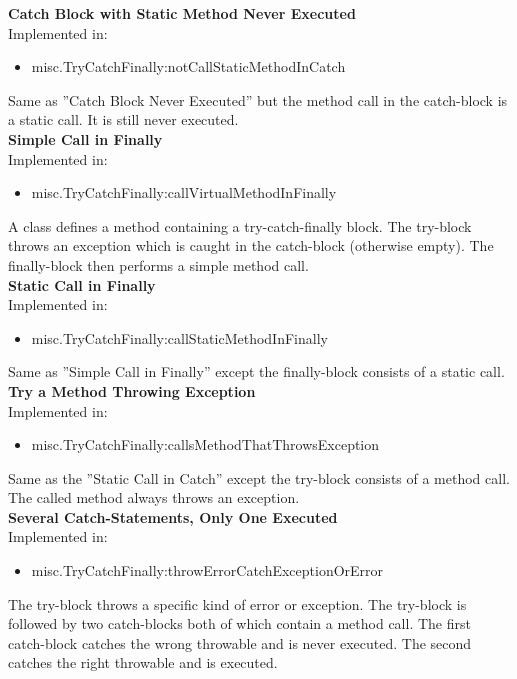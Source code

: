 \documentclass{article}
\begin{document}
\noindent
\textbf{Catch Block with Static Method Never Executed}\\
Implemented in: 
\begin{itemize}
    \item misc.TryCatchFinally:notCallStaticMethodInCatch
\end{itemize}
Same as ''Catch Block Never Executed'' but the method call in the catch-block is a static call. It is still never executed.\\

\noindent
\textbf{Simple Call in Finally}\\
Implemented in: 
\begin{itemize}
    \item misc.TryCatchFinally:callVirtualMethodInFinally
\end{itemize}
A class defines a method containing a try-catch-finally block. The try-block throws an exception which is caught in the catch-block (otherwise empty). The finally-block then performs a simple method call.\\

\noindent
\textbf{Static Call in Finally}\\
Implemented in: 
\begin{itemize}
    \item misc.TryCatchFinally:callStaticMethodInFinally
\end{itemize}
Same as ''Simple Call in Finally'' except the finally-block consists of a static call.\\

\noindent
\textbf{Try a Method Throwing Exception}\\
Implemented in: 
\begin{itemize}
    \item misc.TryCatchFinally:callsMethodThatThrowsException
\end{itemize}
Same as the ''Static Call in Catch'' except the try-block consists of a method call. The called method always throws an exception.\\

\noindent
\textbf{Several Catch-Statements, Only One Executed}\\
Implemented in: 
\begin{itemize}
    \item misc.TryCatchFinally:throwErrorCatchExceptionOrError
\end{itemize}
The try-block throws a specific kind of error or exception. The try-block is followed by two catch-blocks both of which contain a method call. The first catch-block catches the wrong throwable and is never executed. The second catches the right throwable and is executed.\\
\end{document}
